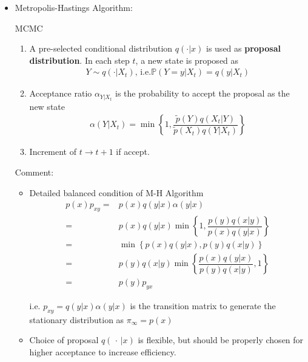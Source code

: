 \begin{itemize}[topsep=2pt,itemsep=0pt]
    \item Metropolis-Hastings Algorithm:
    \begin{algorithm}{MCMC}
    \begin{enumerate}[topsep=2pt,itemsep=2pt]
        \item A pre-selected conditional distribution $ q(\cdot|x) $ is used as \textbf{proposal distribution}. In each step $ t $, a new state is proposed as 
        \begin{align}
            Y\sim q(\cdot|X_t), \,\mathrm{i.e. }\mathbb{P}\left( Y=y|X_t \right) =q(y|X_t)
        \end{align}
        \item Acceptance ratio $ \alpha_{Y|X_t}  $ is the probability to accept the proposal as the new state
        \begin{align}
            \alpha (Y|X_t)= \min\left\{ 1,\dfrac{\tilde{p}(Y)q(X_t|Y)}{\tilde{p}(X_t)q(Y|X_t)} \right\}
        \end{align}
        \item Increment of $ t\to t+1 $ if accept.
    \end{enumerate}

    \end{algorithm}
        

    Comment: 
    \begin{itemize}[topsep=2pt,itemsep=0pt]
        \item Detailed balanced condition of M-H Algorithm
\begin{align}
    p(x)p_{xy}=&p(x)q(y|x)\alpha (y|x)\\
    =& p(x)q(y|x)\min\left\{ 1,\dfrac{p(y)q(x|y)}{p(x)q(y|x)} \right\}\\
    =&\min\left\{p(x)q(y|x), p(y)q(x|y)\right\}\\
    =&p(y)q(x|y)\min\left\{\dfrac{p(x)q(y|x)}{p(y)q(x|y)},1 \right\}\\
    =&p(y)p_{yx}
\end{align}

    i.e. $ p_{xy}=q(y|x)\alpha (y|x) $ is the transition matrix to generate the stationary distribution as $ \pi_{\infty}=p(x) $
    \item Choice of proposal $ q(\, \cdot \, |x) $ is flexible, but should be properly chosen for higher acceptance to increase efficiency. 
    \end{itemize}
    
    
    
        
\end{itemize}

